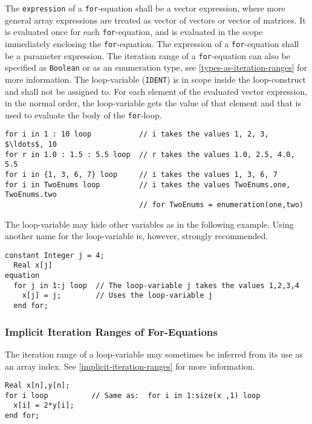 The \lstinline!expression! of a \lstinline!for!-equation shall be a vector expression, where more general array expressions are treated as vector of vectors or vector of matrices.
It is evaluated once for each \lstinline!for!-equation, and is evaluated in the scope immediately enclosing the \lstinline!for!-equation.
The expression of a \lstinline!for!-equation shall be a parameter expression.
The iteration range of a \lstinline!for!-equation can also be specified as \lstinline!Boolean! or as an enumeration type, see \cref{types-as-iteration-ranges} for more information.
The loop-variable (\lstinline!IDENT!) is in scope inside the loop-construct and shall not be assigned to.
For each element of the evaluated vector expression, in the normal order, the loop-variable gets the value of that element and that is used to evaluate the body of the \lstinline!for!-loop.

\begin{example}
\begin{lstlisting}[language=modelica]
for i in 1 : 10 loop           // i takes the values 1, 2, 3, $\ldots$, 10
for r in 1.0 : 1.5 : 5.5 loop  // r takes the values 1.0, 2.5, 4.0, 5.5
for i in {1, 3, 6, 7} loop     // i takes the values 1, 3, 6, 7
for i in TwoEnums loop         // i takes the values TwoEnums.one, TwoEnums.two
                               // for TwoEnums = enumeration(one,two)
\end{lstlisting}

The loop-variable may hide other variables as in the following example.  Using another name for the loop-variable is, however, strongly recommended.
\begin{lstlisting}[language=modelica]
  constant Integer j = 4;
  Real x[j]
equation
  for j in 1:j loop  // The loop-variable j takes the values 1,2,3,4
    x[j] = j;        // Uses the loop-variable j
  end for;
\end{lstlisting}
\end{example}


\subsubsection{Implicit Iteration Ranges of For-Equations}\label{implicit-iteration-ranges-of-for-equations}

The iteration range of a loop-variable may sometimes be inferred from its use as an array index.  See \cref{implicit-iteration-ranges} for more information.

\begin{example}
\begin{lstlisting}[language=modelica]
  Real x[n],y[n];
for i loop          // Same as:  for i in 1:size(x ,1) loop
  x[i] = 2*y[i];
end for;
\end{lstlisting}
\end{example}

